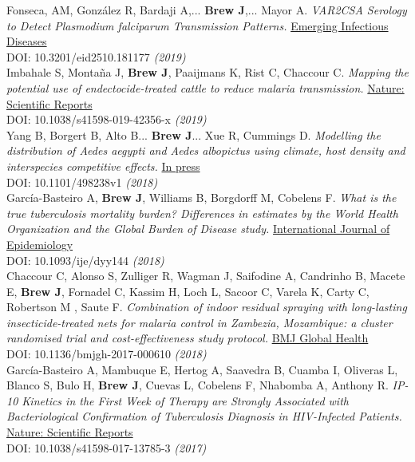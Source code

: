 \documentclass[11pt]{article}
\begin{document}
\noindent Fonseca, AM, González R, Bardaji A,... \textbf{Brew J},... Mayor A. \emph{VAR2CSA Serology to Detect Plasmodium falciparum Transmission Patterns.} \href{https://wwwnc.cdc.gov/eid/article/25/10/18-1177_article}{Emerging Infectious Diseases} \\ DOI: 10.3201/eid2510.181177 \hfill \emph{(2019)} \\  


\noindent Imbahale S, Montaña J, \textbf{Brew J}, Paaijmans K, Rist C, Chaccour C. \emph{Mapping the potential use of endectocide-treated cattle to reduce malaria transmission.} \href{www.nature.com/articles/s41598-019-42356-x}{Nature: Scientific Reports} \\ DOI: 10.1038/s41598-019-42356-x \hfill \emph{(2019)} \\


\noindent Yang B, Borgert B, Alto B... \textbf{Brew J}... Xue R, Cummings D. \emph{Modelling the distribution of Aedes aegypti and Aedes albopictus using climate, host density and interspecies competitive effects.} \href{https://www.biorxiv.org/content/biorxiv/early/2018/12/17/498238.full.pdf}{In press} \\ DOI: 10.1101/498238v1 \hfill \emph{(2018)} \\


\noindent García-Basteiro A, \textbf{Brew J}, Williams B, Borgdorff M, Cobelens F. \emph{What is the true tuberculosis mortality burden? Differences in estimates by the World Health Organization and the Global Burden of Disease study.} \href{https://academic.oup.com/ije/advance-article-abstract/doi/10.1093/ije/dyy144/5053290}{International Journal of Epidemiology} \\ DOI: 10.1093/ije/dyy144 \hfill \emph{(2018)} \\

\noindent Chaccour C, Alonso S, Zulliger R, Wagman J, Saifodine A, Candrinho B, Macete E, \textbf{Brew J}, Fornadel C, Kassim H, Loch L, Sacoor C, Varela K,  Carty C, Robertson  M , Saute F. \emph{Combination of indoor residual spraying with long-lasting insecticide-treated nets for malaria control in Zambezia, Mozambique: a cluster randomised trial and cost-effectiveness study protocol.} \href{http://gh.bmj.com/content/3/1/e000610}{BMJ Global Health} \\ DOI: 10.1136/bmjgh-2017-000610 \hfill \emph{(2018)} \\

\noindent García-Basteiro A, Mambuque E, Hertog A, Saavedra B, Cuamba I, Oliveras L, Blanco S, Bulo H, \textbf{Brew J}, Cuevas L, Cobelens F, Nhabomba A, Anthony R. \emph{IP-10 Kinetics in the First Week of Therapy are Strongly Associated with Bacteriological Confirmation of Tuberculosis Diagnosis in HIV-Infected Patients.} \href{https://www.nature.com/articles/s41598-017-13785-3}{Nature: Scientific Reports} \\ DOI: 10.1038/s41598-017-13785-3 \hfill \emph{(2017)} \\
\end{document}
